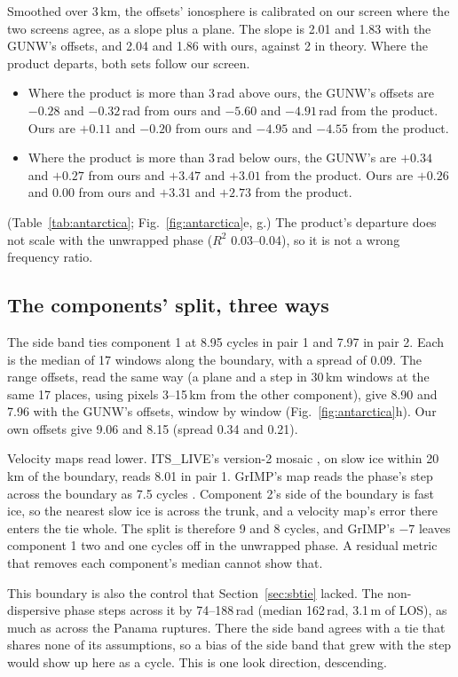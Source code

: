 Smoothed over 3\,km, the offsets' ionosphere is calibrated on our screen where the two screens agree, as a slope plus a
plane. The slope is 2.01 and 1.83 with the GUNW's offsets, and 2.04 and 1.86 with ours, against 2 in theory. Where the
product departs, both sets follow our screen.
\begin{itemize}
  \item Where the product is more than 3\,rad above ours, the GUNW's offsets are $-0.28$ and $-0.32$\,rad from ours and
        $-5.60$ and $-4.91$\,rad from the product. Ours are $+0.11$ and $-0.20$ from ours and $-4.95$ and $-4.55$ from the
        product.
  \item Where the product is more than 3\,rad below ours, the GUNW's are $+0.34$ and $+0.27$ from ours and $+3.47$ and
        $+3.01$ from the product. Ours are $+0.26$ and $0.00$ from ours and $+3.31$ and $+2.73$ from the product.
\end{itemize}
(Table~\ref{tab:antarctica}; Fig.~\ref{fig:antarctica}e, g.) The product's departure does not scale with the unwrapped
phase ($R^2$ 0.03--0.04), so it is not a wrong frequency ratio.

\subsection{The components' split, three ways}
The side band ties component 1 at 8.95 cycles in pair 1 and 7.97 in pair 2. Each is the median of 17 windows along the
boundary, with a spread of 0.09. The range offsets, read the same way (a plane and a step in 30\,km windows at the same
17 places, using pixels 3--15\,km from the other component), give 8.90 and 7.96 with the GUNW's offsets, window by
window (Fig.~\ref{fig:antarctica}h). Our own offsets give 9.06 and 8.15 (spread 0.34 and 0.21).

Velocity maps read lower. ITS\_LIVE's version-2 mosaic \citep{gardner2018its,itslive2024v2}, on slow ice within 20\,km of
the boundary, reads 8.01 in pair 1. GrIMP's map reads the phase's step across the boundary as 7.5 cycles
\citep{joughin2026nisarerrors}. Component 2's side of the boundary is fast ice, so the nearest slow ice is across the
trunk, and a velocity map's error there enters the tie whole. The split is therefore 9 and 8 cycles, and GrIMP's $-7$
leaves component 1 two and one cycles off in the unwrapped phase. A residual metric that removes each component's
median cannot show that.

This boundary is also the control that Section~\ref{sec:sbtie} lacked. The non-dispersive phase steps across it by
74--188\,rad (median 162\,rad, 3.1\,m of LOS), as much as across the Panama ruptures. There the side band agrees with a
tie that shares none of its assumptions, so a bias of the side band that grew with the step would show up here as a
cycle. This is one look direction, descending.

